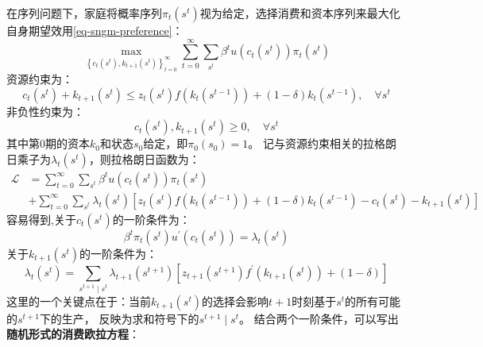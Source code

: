 在序列问题下，家庭将概率序列$\pi_t\left(s^t\right)$视为给定，选择消费和资本序列来最大化自身期望效用\ref{eq-sngm-preference}：
\begin{equation*}
    \max _{\left\{c_t\left(s^t\right), k_{t+1}\left(s^t\right)\right\}_{t=0}^{\infty}} 
        \sum_{t=0}^{\infty} \sum_{s^t} \beta^t u\left(c_t\left(s^t\right)\right) \pi_t\left(s^t\right)
\end{equation*}
资源约束为：
\begin{equation}    \label{eq-sngm-rc}
    c_t\left(s^t\right)+k_{t+1}\left(s^t\right) \leq z_t\left(s^t\right) f\left(k_t\left(s^{t-1}\right)\right)
        + \left(1-\delta\right)k_t\left(s^{t-1}\right), \quad \forall s^t
\end{equation}
非负性约束为：
\begin{equation*}
    c_t\left(s^t\right), k_{t+1}\left(s^t\right) \geq 0, \quad \forall s^t
\end{equation*}
其中第0期的资本$k_0$和状态$s_0$给定，即$\pi_0\left(s_0\right)=1$。
记与资源约束相关的拉格朗日乘子为$\lambda_t\left(s^t\right)$，则拉格朗日函数为：
\begin{equation*}
    \begin{aligned}
        \mathcal{L} &=\sum_{t=0}^{\infty} \sum_{s^t} \beta^t u\left(c_t\left(s^t\right)\right) \pi_t\left(s^t\right) \\
            &+\sum_{t=0}^{\infty} \sum_{s^t} \lambda_t\left(s^t\right)
            \left[z_t\left(s^t\right)f\left(k_t\left(s^{t-1}\right)\right)+\left(1-\delta\right)k_t\left(s^{t-1}\right)
            -c_t\left(s^t\right)-k_{t+1}\left(s^t\right)\right]
    \end{aligned}
\end{equation*}
容易得到,关于$c_t\left(s^t\right)$的一阶条件为：
\begin{equation}    \label{eq-sngm-foc-c}
    \beta^t \pi_t\left(s^t\right) u^{\prime}\left(c_t\left(s^t\right)\right)=\lambda_t\left(s^t\right)
\end{equation}
关于$k_{t+1}\left(s^t\right)$的一阶条件为：
\begin{equation}    \label{eq-sngm-foc-k}
    \lambda_t\left(s^t\right)=\sum_{s^{t+1} \mid s^t} \lambda_{t+1}\left(s^{t+1}\right)
        \left[z_{t+1}\left(s^{t+1}\right)f^{\prime}\left(k_{t+1}\left(s^t\right)\right)+\left(1-\delta\right)\right]
\end{equation}
这里的一个关键点在于：当前$k_{t+1}\left(s^t\right)$的选择会影响$t+1$时刻基于$s^t$的所有可能的$s^{t+1}$下的生产，
反映为求和符号下的$s^{t+1} \mid s^t$。
结合两个一阶条件，可以写出\textbf{随机形式的消费欧拉方程}：
